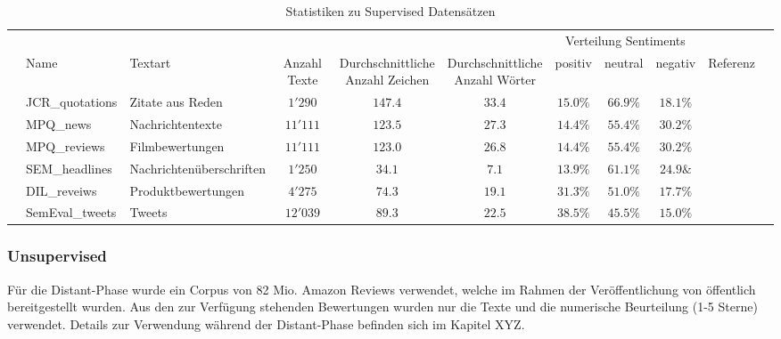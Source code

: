 \begin{table}[h]
	\begin{adjustbox}{max width=\textwidth}
		\begin{tabular}{@{}lllcccccccl@{}}
			\toprule
			& & & & & & \multicolumn{3}{c}{Verteilung Sentiments} &\\
			\cmidrule(r){7-9}
			& Name & Textart & Anzahl Texte & \specialcell{Durchschnittliche\\Anzahl Zeichen} & \specialcell{Durchschnittliche\\Anzahl Wörter} & positiv & neutral & negativ & Referenz &\\ \midrule
			& JCR{\_}quotations & Zitate aus Reden & $1'290$ & $147.4$ & $33.4$ & $15.0\%$ & $66.9\%$ & $18.1\%$ & \cite{cieliebak2013potential}\\
			& MPQ{\_}news & Nachrichtentexte & $11'111$ & $123.5$ & $27.3$ & $14.4\%$ & $55.4\%$ & $30.2\%$ & \cite{cieliebak2013potential}\\
			& MPQ{\_}reviews & Filmbewertungen & $11'111$ & $123.0$ & $26.8$  & $14.4\%$ & $55.4\%$ & $30.2\%$ & \cite{cieliebak2013potential}\\
			& SEM{\_}headlines & Nachrichtenüberschriften & $1'250$ & $34.1$ & $7.1$ & $13.9\%$ & $61.1\%$ & $24.9\&$ & \cite{cieliebak2013potential}\\
			& DIL{\_}reveiws & Produktbewertungen & $4'275$ & $74.3$ & $19.1$ & $31.3\%$ & $51.0\%$ & $17.7\%$ & \cite{cieliebak2013potential}\\
			& SemEval{\_}tweets & Tweets & $12'039$ & $89.3$ & $22.5$ & $38.5\%$ & $45.5\%$ & $15.0\%$ & \cite{SemEval:2016:task4}\\
			\bottomrule
		\end{tabular}
	\end{adjustbox}
	\caption{Statistiken zu Supervised Datensätzen}
\end{table}

\subsubsection{Unsupervised}
Für die Distant-Phase wurde ein Corpus von 82 Mio. Amazon Reviews verwendet, welche im Rahmen der Veröffentlichung von \cite{zhang2015character} öffentlich bereitgestellt wurden. Aus den zur Verfügung stehenden Bewertungen wurden nur die Texte und die numerische Beurteilung (1-5 Sterne) verwendet. Details zur Verwendung während der Distant-Phase befinden sich im Kapitel XYZ. 

